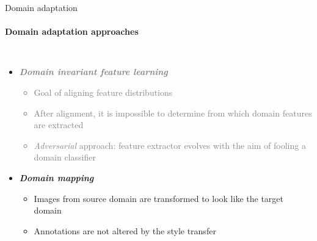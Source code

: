 \documentclass[aspectratio=141]{beamer}
\begin{document}
\begin{frame}{Domain adaptation}
    \framesubtitle{Domain adaptation approaches}
    
    \begin{columns}
        \vspace*{-9mm}
        \begin{itemize}
            \item \textcolor<2->{gray}{
                \textbf{\textit{Domain invariant feature learning}}
                \begin{itemize}
                    \item \textcolor<2->{gray}{Goal of aligning feature distributions}
                    \item \textcolor<2->{gray}{After alignment, it is impossible to determine from which domain features are extracted}
                    \item \textcolor<2->{gray}{\textit{Adversarial} approach: feature extractor evolves with the aim of fooling a domain classifier}
                \end{itemize}
            }
            \vspace*{2mm}
            \item<2-> \textbf{\textit{Domain mapping}}
                \begin{itemize}
                    \item Images from source domain are transformed to look like the target domain
                    \item Annotations are not altered by the style transfer
                \end{itemize}
        \end{itemize}
        
\end{columns}
\end{frame}
\end{document}
